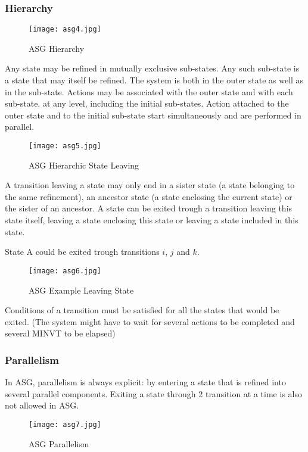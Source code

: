 \documentclass[../main.tex]{subfiles}
\begin{document}
\subsubsection{Hierarchy}
\begin{figure}[H]
    \centering
    \texttt{[image: asg4.jpg]}
    \caption{ASG Hierarchy}
    \label{asg4}
\end{figure}
Any state may be refined in mutually exclusive sub-states. Any such sub-state is a state that may itself be refined. The system is both in the outer state as well as in the sub-state. Actions may be associated with the outer state and with each sub-state, at any level, including the initial sub-states. Action attached to the outer state and to the initial sub-state start simultaneously and are performed in parallel.
\begin{figure}[H]
    \centering
    \texttt{[image: asg5.jpg]}
    \caption{ASG Hierarchic State Leaving}
    \label{asg5}
\end{figure}
A transition leaving a state may only end in a sister state (a state belonging to the same refinement), an ancestor state (a state enclosing the current state) or the sister of an ancestor. A state can be exited trough a transition leaving this state itself, leaving a state enclosing this state or leaving a state included in this state.
\begin{exmp}
State A could be exited trough transitions $i$, $j$ and $k$.
\begin{figure}[H]
    \centering
    \texttt{[image: asg6.jpg]}
    \caption{ASG Example Leaving State}
    \label{asg6}
\end{figure}
\end{exmp}
Conditions of a transition must be satisfied for all the states that would be exited. (The system might have to wait for several actions to be completed and several MINVT to be elapsed)

\subsubsection{Parallelism}
In ASG, parallelism is always explicit: by entering a state that is refined into several parallel components. Exiting a state through 2 transition at a time is also not allowed in ASG.

\begin{figure}[H]
    \centering
    \texttt{[image: asg7.jpg]}
    \caption{ASG Parallelism}
    \label{asg6}
\end{figure}
\end{document}
